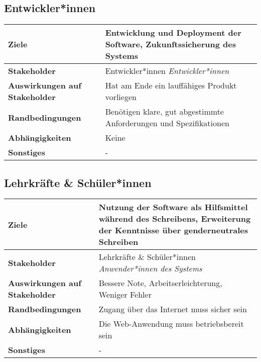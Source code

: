 \documentclass[paper=a4, parskip=half]{scrreprt}
\begin{document}
\subsection{Entwickler*innen}
\begin{tabular}
	{
	|p{}
	|p{}
	|
	}
	\hline
	\textbf{Ziele}
	&Entwicklung und Deployment der Software, Zukunftssicherung des Systems\\
	\hline
	\textbf{Stakeholder}
	&Entwickler*innen
	\newline \textit{Entwickler*innen}\\
	\hline
	\textbf{Auswirkungen auf Stakeholder}
	&Hat am Ende ein lauffähiges Produkt vorliegen\\
	\hline
	\textbf{Randbedingungen}
	&Benötigen klare, gut abgestimmte Anforderungen und Spezifikationen\\
	\hline
	\textbf{Abhängigkeiten}
	&Keine\\
	\hline
	\textbf{Sonstiges}
	&-\\
	\hline
\end{tabular}

\subsection{Lehrkräfte \& Schüler*innen}
\begin{tabular}
	{
	|p{}
	|p{}
	|
	}
	\hline
	\textbf{Ziele}
	&Nutzung der Software als Hilfsmittel während des Schreibens, Erweiterung der Kenntnisse über genderneutrales Schreiben\\
	\hline
	\textbf{Stakeholder}
	&Lehrkräfte \& Schüler*innen
	\newline \textit{Anwender*innen des Systems}\\
	\hline
	\textbf{Auswirkungen auf Stakeholder}
	&Bessere Note, Arbeitserleichterung, Weniger Fehler\\
	\hline
	\textbf{Randbedingungen}
	&Zugang über das Internet muss sicher sein\\
	\hline
	\textbf{Abhängigkeiten}
	&Die Web-Anwendung muss betriebsbereit sein\\
	\hline
	\textbf{Sonstiges}
	&-\\
	\hline
\end{tabular}
\end{document}

